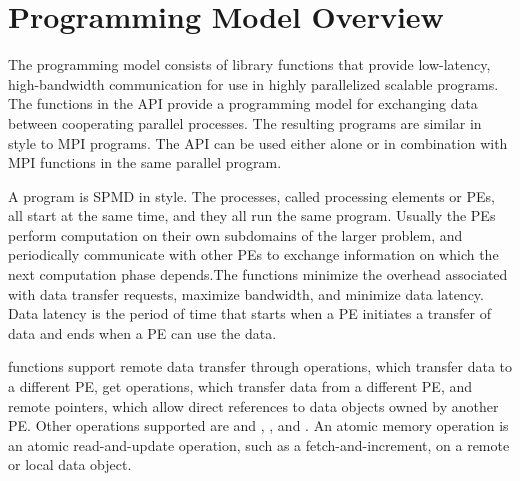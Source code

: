 \section{Programming Model Overview}
The \openshmem programming model consists of library functions that provide
low-latency, high-bandwidth communication  for  use  in  highly  parallelized 
scalable programs. The functions in the \openshmem \ac{API} provide a programming 
model for exchanging data between cooperating parallel processes. The resulting programs are similar 
in style to \ac{MPI} programs. The \openshmem \ac{API} can be used either alone 
or in combination with \ac{MPI} functions in the same parallel program.

A \openshmem program is \ac{SPMD} in style. The
\openshmem  processes,  called  processing elements or \ac{PE}s, all start at the
same time, and they all run the same program.  Usually the \ac{PE}s  perform
computation on their own subdomains of the larger problem, and periodically 
communicate with other \ac{PE}s to exchange information on which the
next computation phase depends.The \openshmem functions minimize the overhead associated with data transfer
requests, maximize bandwidth, and minimize data latency.  Data latency
is  the  period  of  time that starts when a \ac{PE} initiates a transfer of data 
and ends when a \ac{PE} can use the data.

\openshmem functions support remote data transfer through  operations, which  transfer data to a 
different \ac{PE}, get operations, which transfer data from a different \ac{PE}, and remote pointers, which 
allow direct  references  to  data objects owned by another \ac{PE}.  Other operations supported are  
 and , , and . 
An atomic memory operation  is an atomic read-and-update operation, such as a fetch-and-increment, on a remote
or local data object.

